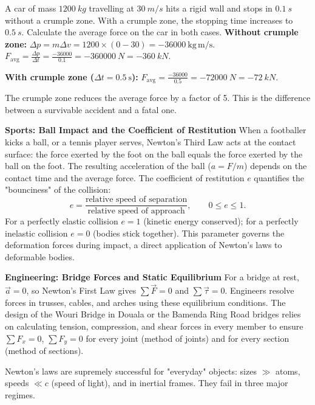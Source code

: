 \documentclass[11pt]{article}
\newcommand{\cle}[1]{{\popxbold\color{popdark}#1}}
\newcounter{popsec}
\newcounter{popsub}
\newcommand{\courssub}[1]{%
  \stepcounter{popsub}%
  \par\vspace{9pt}\noindent{\popxbold\fontsize{11.5}{13}\selectfont\color{popink}{\color{poporange}\thepopsec.\thepopsub}\hspace{6pt}#1}\par\nopagebreak\vspace{4pt}
}
\begin{document}
\begin{exemplebox}
A car of mass $\SI{1200}{kg}$ travelling at $\SI{30}{m/s}$ hits a rigid wall and stops in $\SI{0.1}{s}$ without a crumple zone. With a crumple zone, the stopping time increases to $\SI{0.5}{s}$. Calculate the average force on the car in both cases.
\tcblower
\textbf{Without crumple zone:}
$\Delta p = m\Delta v = 1200 \times (0 - 30) = -36000\ \mathrm{kg\,m/s}$.
$F_{\text{avg}} = \frac{\Delta p}{\Delta t} = \frac{-36000}{0.1} = -\SI{360000}{N} = -\SI{360}{kN}$.

\textbf{With crumple zone ($\Delta t = 0.5\ \mathrm{s}$):}
$F_{\text{avg}} = \frac{-36000}{0.5} = -\SI{72000}{N} = -\SI{72}{kN}$.

The crumple zone reduces the average force by a factor of 5. This is the difference between a survivable accident and a fatal one.
\end{exemplebox}

\textbf{Sports: Ball Impact and the Coefficient of Restitution}
When a footballer kicks a ball, or a tennis player serves, Newton's Third Law acts at the contact surface: the force exerted by the foot on the ball equals the force exerted by the ball on the foot. The resulting acceleration of the ball ($a = F/m$) depends on the contact time and the average force. The \cle{coefficient of restitution} $e$ quantifies the "bounciness" of the collision:
\[
e = \frac{\text{relative speed of separation}}{\text{relative speed of approach}}, \qquad 0 \le e \le 1.
\]
For a perfectly elastic collision $e=1$ (kinetic energy conserved); for a perfectly inelastic collision $e=0$ (bodies stick together). This parameter governs the deformation forces during impact, a direct application of Newton's laws to deformable bodies.

\textbf{Engineering: Bridge Forces and Static Equilibrium}
For a bridge at rest, $\vec{a} = 0$, so Newton's First Law gives $\sum \vec{F} = 0$ and $\sum \vec{\tau} = 0$. Engineers resolve forces in trusses, cables, and arches using these equilibrium conditions. The design of the Wouri Bridge in Douala or the Bamenda Ring Road bridges relies on calculating tension, compression, and shear forces in every member to ensure $\sum F_x = 0$, $\sum F_y = 0$ for every joint (method of joints) and for every section (method of sections).

\courssub{Limitations of Newton's Laws}

Newton's laws are supremely successful for "everyday" objects: sizes $\gg$ atoms, speeds $\ll c$ (speed of light), and in inertial frames. They fail in three major regimes.
\end{document}
